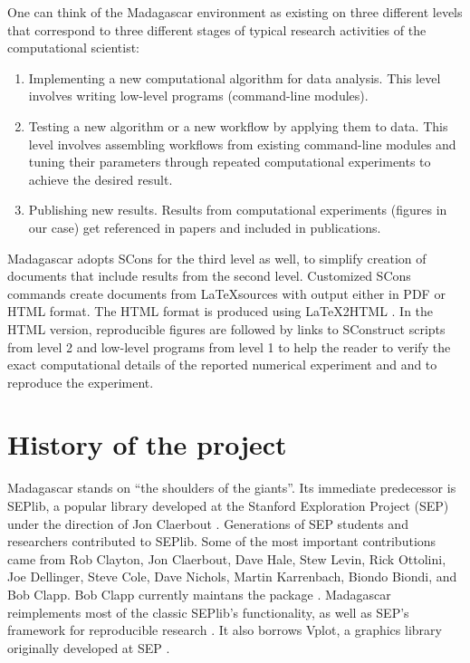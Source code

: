 One can think of the Madagascar environment as existing on three
different levels that correspond to three different stages of typical research
activities of the computational scientist:
\begin{enumerate}
\item Implementing a new computational algorithm for data analysis. This
level involves writing low-level programs (command-line modules).
\item Testing a new algorithm or a new workflow by applying them to
data. This level involves assembling workflows from existing
command-line modules and tuning their parameters through repeated
computational experiments to achieve the desired result.
\item Publishing new results. Results from computational experiments
(figures in our case) get referenced in papers and included in
publications.
\end{enumerate}

Madagascar adopts SCons for the third level as well, to simplify creation of
documents that include results from the second level. Customized SCons
commands create documents from \LaTeX sources with output either in PDF
or HTML format. The HTML format is produced using \LaTeX2HTML \cite[]{drakos1994text}. In
the HTML version, reproducible figures are followed by links to
SConstruct scripts from level 2 and low-level programs from level 1 to
help the reader to verify the exact computational details of the
reported numerical experiment and and to reproduce the experiment.


\section{History of the project}

Madagascar stands on ``the shoulders of the giants''. Its immediate
predecessor is SEPlib, a popular library developed at the Stanford
Exploration Project (SEP) under the direction of Jon Claerbout
\cite[]{Claerbout.sep.70.413,Nichols.sep.82.257,Clapp.sep.102.bob1}. Generations
of SEP students and researchers contributed to SEPlib. Some of the most important
contributions came from Rob Clayton, Jon Claerbout, Dave Hale, Stew
Levin, Rick Ottolini, Joe Dellinger, Steve Cole, Dave Nichols, Martin
Karrenbach, Biondo Biondi, and Bob Clapp. Bob Clapp currently maintans
the package \cite[]{clapp2012seplib}. Madagascar reimplements most of
the classic SEPlib's functionality, as well as SEP's framework for
reproducible research
\cite[]{Schwab.sep.89.217,Fomel.sep.94.matt3}. It also borrows Vplot,
a graphics library originally developed at SEP \cite[]{Cole.sep.60.349,Dellinger.sep.61.327}.

